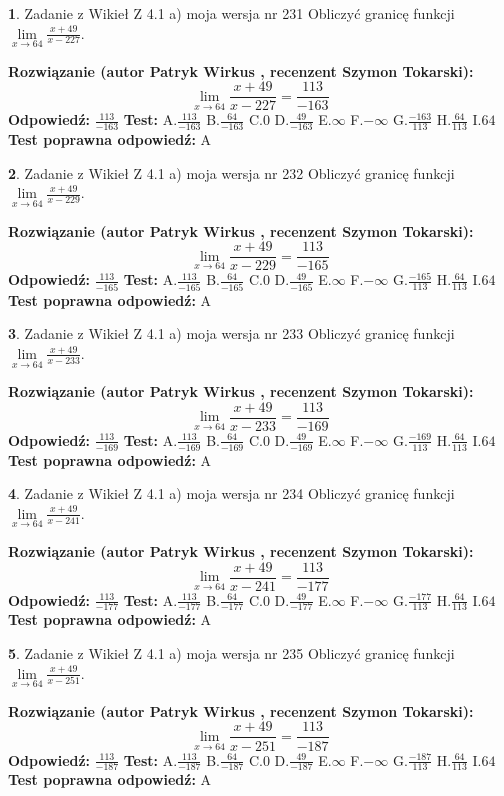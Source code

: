 \documentclass[12pt, a4paper]{article}
\theoremstyle{definition} %
\newtheorem{zad}{}
\newcommand{\zadStart}[1]{\begin{zad}#1\newline}
\newcommand{\zadStop}{\end{zad}}
\newcommand{\rozwStart}[2]{\noindent \textbf{Rozwiązanie (autor #1 , recenzent #2): }\newline}
\newcommand{\rozwStop}{\newline}
\newcommand{\odpStart}{\noindent \textbf{Odpowiedź:}\newline}
\newcommand{\odpStop}{\newline}
\newcommand{\testStart}{\noindent \textbf{Test:}\newline}
\newcommand{\testStop}{\newline}
\newcommand{\kluczStart}{\noindent \textbf{Test poprawna odpowiedź:}\newline}
\newcommand{\kluczStop}{\newline}
\begin{document}
\zadStart{Zadanie z Wikieł Z 4.1 a) moja wersja nr 231}
Obliczyć granicę funkcji $\lim\limits_{x\to64}\frac{x+49}{x-227}$.
\zadStop
\rozwStart{Patryk Wirkus}{Szymon Tokarski}
$$\lim\limits_{x\to64}\frac{x+49}{x-227} = \frac{113}{-163}$$
\rozwStop
\odpStart
$\frac{113}{-163}$
\odpStop
\testStart
A.$\frac{113}{-163}$
B.$\frac{64}{-163}$
C.$0$
D.$\frac{49}{-163}$
E.$\infty$
F.$-\infty$
G.$\frac{-163}{113}$
H.$\frac{64}{113}$
I.$64$
\testStop
\kluczStart
A
\kluczStop



\zadStart{Zadanie z Wikieł Z 4.1 a) moja wersja nr 232}
Obliczyć granicę funkcji $\lim\limits_{x\to64}\frac{x+49}{x-229}$.
\zadStop
\rozwStart{Patryk Wirkus}{Szymon Tokarski}
$$\lim\limits_{x\to64}\frac{x+49}{x-229} = \frac{113}{-165}$$
\rozwStop
\odpStart
$\frac{113}{-165}$
\odpStop
\testStart
A.$\frac{113}{-165}$
B.$\frac{64}{-165}$
C.$0$
D.$\frac{49}{-165}$
E.$\infty$
F.$-\infty$
G.$\frac{-165}{113}$
H.$\frac{64}{113}$
I.$64$
\testStop
\kluczStart
A
\kluczStop



\zadStart{Zadanie z Wikieł Z 4.1 a) moja wersja nr 233}
Obliczyć granicę funkcji $\lim\limits_{x\to64}\frac{x+49}{x-233}$.
\zadStop
\rozwStart{Patryk Wirkus}{Szymon Tokarski}
$$\lim\limits_{x\to64}\frac{x+49}{x-233} = \frac{113}{-169}$$
\rozwStop
\odpStart
$\frac{113}{-169}$
\odpStop
\testStart
A.$\frac{113}{-169}$
B.$\frac{64}{-169}$
C.$0$
D.$\frac{49}{-169}$
E.$\infty$
F.$-\infty$
G.$\frac{-169}{113}$
H.$\frac{64}{113}$
I.$64$
\testStop
\kluczStart
A
\kluczStop



\zadStart{Zadanie z Wikieł Z 4.1 a) moja wersja nr 234}
Obliczyć granicę funkcji $\lim\limits_{x\to64}\frac{x+49}{x-241}$.
\zadStop
\rozwStart{Patryk Wirkus}{Szymon Tokarski}
$$\lim\limits_{x\to64}\frac{x+49}{x-241} = \frac{113}{-177}$$
\rozwStop
\odpStart
$\frac{113}{-177}$
\odpStop
\testStart
A.$\frac{113}{-177}$
B.$\frac{64}{-177}$
C.$0$
D.$\frac{49}{-177}$
E.$\infty$
F.$-\infty$
G.$\frac{-177}{113}$
H.$\frac{64}{113}$
I.$64$
\testStop
\kluczStart
A
\kluczStop



\zadStart{Zadanie z Wikieł Z 4.1 a) moja wersja nr 235}
Obliczyć granicę funkcji $\lim\limits_{x\to64}\frac{x+49}{x-251}$.
\zadStop
\rozwStart{Patryk Wirkus}{Szymon Tokarski}
$$\lim\limits_{x\to64}\frac{x+49}{x-251} = \frac{113}{-187}$$
\rozwStop
\odpStart
$\frac{113}{-187}$
\odpStop
\testStart
A.$\frac{113}{-187}$
B.$\frac{64}{-187}$
C.$0$
D.$\frac{49}{-187}$
E.$\infty$
F.$-\infty$
G.$\frac{-187}{113}$
H.$\frac{64}{113}$
I.$64$
\testStop
\kluczStart
A
\kluczStop
\end{document}
